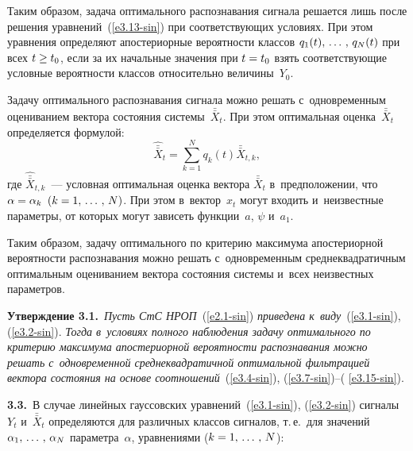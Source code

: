 \begin{multicols}{2}
Таким образом, задача оптимального распознавания сигнала решается
лишь после решения уравнений~(\ref{e3.13-sin})  при
соответствующих условиях. При этом уравнения определяют
апостериорные вероятности классов $q_1(t),\,\ldots\,,\, q_N(t)$ при всех
$t\hm\ge t_0$, если за их начальные значения при  $t\hm=t_0$ взять
соответствующие условные вероятности классов относительно величины~$Y_0$.

Задачу оптимального распознавания сигнала можно решать 
с~одновременным оцениванием вектора состояния сис\-те\-мы~$\bar{\bar X}_t$. При
этом оптимальная оценка~$\bar{\bar X}_t$ определяется формулой:
  \begin{equation}
    \hat{\bar{\bar X}}_t = \sum\limits_{k=1}^N q_k (t) \hat{\bar{\bar X}}_{t,k},
    \label{e3.15-sin}
 \end{equation}
где $\hat{\bar{\bar X}}_{t,k}$~--- условная оптимальная оценка вектора  $\bar{\bar X}_t$ 
в~предположении, что  $\alpha\hm=\alpha_k$ $(k\hm=1\tr N)$. При этом 
в~вектор~$x_t$ могут входить и~неизвестные па\-ра\-мет\-ры, от которых
могут зависеть функции~$a$, $\psi$ и~$a_1$.

Таким образом, задачу оптимального по критерию максимума апостериорной
вероятности распознавания можно решать с~одновременным среднеквадратичным
оптимальным оцениванием вектора состояния системы и~всех
неизвестных па\-ра\-мет\-ров.
{

}

\medskip

\noindent
\textbf{Утверждение 3.1.}\
\textit{Пусть СтС НРОП}~(\ref{e2.1-sin}) 
\textit{приведена к~виду}~(\ref{e3.1-sin}), (\ref{e3.2-sin}). 
\textit{Тогда в~условиях полного наблюдения задачу оптимального по критерию максимума
 апостериорной вероятности распознавания можно решать с~одновременной среднеквадратичной 
 оптимальной фильтрацией вектора состояния на основе соотношений}~(\ref{e3.4-sin}), 
 (\ref{e3.7-sin})--( \ref{e3.15-sin}).

\smallskip

\textbf{3.3.}\
В случае линейных гауссовских уравнений~(\ref{e3.1-sin}), 
(\ref{e3.2-sin}) сигналы~$Y_t$ и~$\bar{\bar X}_t$ определяются
 для различных классов сигналов, т.\,е.\ для значений $\alpha_1,\,\ldots\,,\, \alpha_N$
 параметра~$\alpha$, уравнениями ($k\hm=1\tr N$):
 

\end{multicols}
